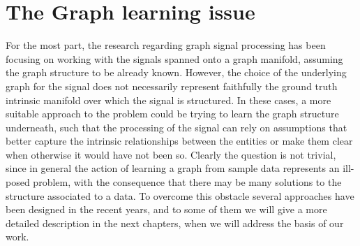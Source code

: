 \chapter{The Graph learning issue}
For the most part, the research regarding graph signal processing has been focusing on working with the signals spanned onto a graph manifold, assuming the graph structure to be already known. However, the choice of the underlying graph for the signal does not necessarily represent faithfully the ground truth intrinsic manifold over which the signal is structured. In these cases, a more suitable approach to the problem could be trying to learn the graph structure underneath, such that the processing of the signal can rely on assumptions that better capture the intrinsic relationships between the entities or make them clear when otherwise it would have not been so.\cite{Maretic2017} Clearly the question is not trivial, since in general the action of learning a graph from sample data represents an ill-posed problem, with the consequence that there may be many solutions to the structure associated to a data. \cite{Dong2016} To overcome this obstacle several approaches have been designed in the recent years, and to some of them we will give a more detailed description in the next chapters, when we will address the basis of our work.
